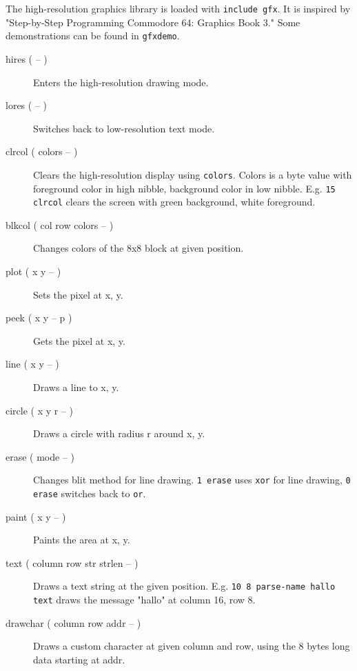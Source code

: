 The high-resolution graphics library is loaded with \texttt{include gfx}.
It is inspired by "Step-by-Step Programming Commodore 64: Graphics Book 3."
Some demonstrations can be found in \texttt{gfxdemo}.
\begin{description}
\item[hires ( -- )] Enters the high-resolution drawing mode.
\item[lores ( -- )] Switches back to low-resolution text mode.
\item[clrcol ( colors -- )] Clears the high-resolution display using \texttt{colors}. Colors is a
byte value with foreground color in high nibble, background color in low nibble. E.g. \texttt{15
clrcol} clears the screen with green background, white foreground.
\item[blkcol ( col row colors -- )] Changes colors of the 8x8 block at given position.
\item[plot ( x y -- )] Sets the pixel at x, y.
\item[peek ( x y -- p )] Gets the pixel at x, y.
\item[line ( x y -- )] Draws a line to x, y.
\item[circle ( x y r -- )] Draws a circle with radius r around x, y.
\item[erase ( mode -- )] Changes blit method for line drawing. \texttt{1 erase} uses \texttt{xor}
for line drawing, \texttt{0 erase} switches back to \texttt{or}.
\item[paint ( x y -- )] Paints the area at x, y.
\item[text ( column row str strlen -- )] Draws a text string at the given position. E.g. \texttt{10
8 parse-name hallo text} draws the message "hallo" at column 16, row 8.
\item[drawchar ( column row addr -- )] Draws a custom character at given column and row, using the 8 bytes long data starting at addr.
\end{description}
